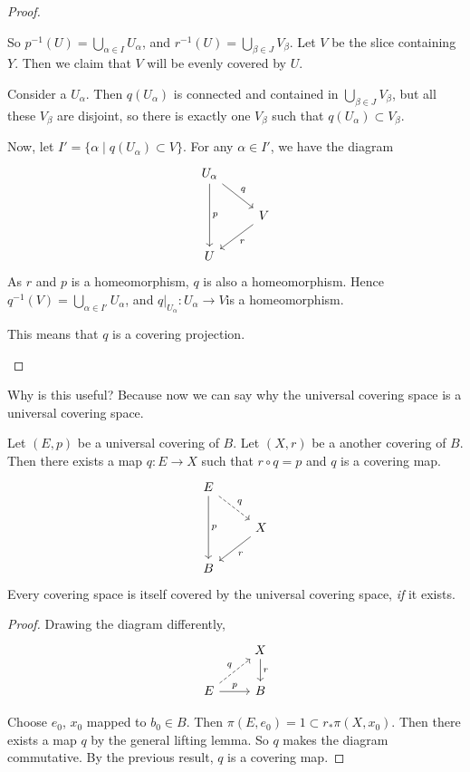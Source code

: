\begin{proof}
\begin{itemize}
            So $p ^{-1}(U) = \bigcup_{\alpha \in I} U_\alpha$, and $r^{-1}(U) = \bigcup_{\beta \in J} V_\beta$.
            Let $V$ be the slice containing $Y$.
            Then we claim that $V$ will be evenly covered by $U$.

            Consider a $U_\alpha$. Then $q(U_\alpha)$ is connected and contained in $\bigcup_{\beta \in J} V_\beta$, but all these $V_\beta$ are disjoint, so there is exactly one $V_\beta$ such that $q(U_\alpha) \subset V_\beta$.

            Now, let $I' = \{\alpha  \mid q(U_\alpha) \subset V\} $.
            For any $\alpha \in I'$, we have the diagram
            \[
                \begin{tikzcd}
                    U_\alpha \arrow[dd, "p"] \arrow[dr, "q"]\\
                    & V \arrow[dl, "r"]\\
                    U 
                \end{tikzcd}
            \]
            As $r$ and $p$ is a homeomorphism, $q$ is also a homeomorphism.
            Hence $q^{-1}(V) = \bigcup_{\alpha \in I'} U_\alpha$,
            and $q|_{U_\alpha}: U_\alpha \to  V$is a homeomorphism.

            This means that $q$ is a covering projection.
    \end{itemize}
\end{proof}


Why is this useful? Because now we can say why the universal covering space is a universal covering space.

\begin{theorem}[57.3]
    Let $(E, p)$ be a universal covering of $B$.
    Let $(X, r)$ be a another covering of $B$.
    Then there exists a map $q: E \to  X$ such that $r  \circ  q = p$ and $q$ is a covering map.
    \[
        \begin{tikzcd}
            E \arrow[dd, "p"] \arrow[dr, dashed, "q"]\\
            & X \arrow[dl, "r"]\\
            B &
        \end{tikzcd}
    \]
    Every covering space is itself covered by the universal covering space, \emph{if} it exists.
\end{theorem}
\begin{proof}
    Drawing the diagram differently,
    \[
        \begin{tikzcd}
            & X \arrow[d, "r"]\\
            E \arrow[ur, dashed, "q"]\arrow[r, "p"] & B
        \end{tikzcd}
    \]

    Choose $e_0$, $x_0$ mapped to $b_0 \in B$.
    Then $\pi(E, e_0) = 1 \subset r_* \pi(X,x_0)$.
    Then there exists a map $q$ by the general lifting lemma.
    So $q$ makes the diagram commutative.
    By the previous result, $q$ is a covering map.
\end{proof}


